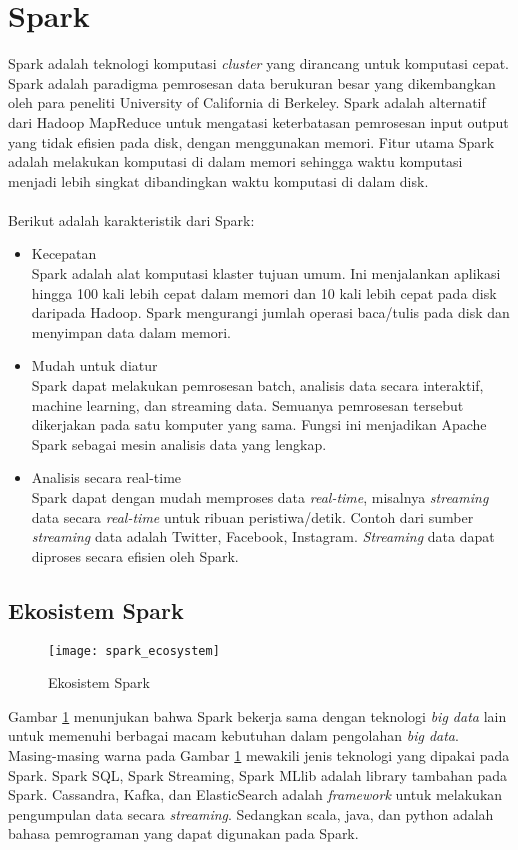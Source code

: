 \section{Spark} 
\label{sec:konsep_spark}
Spark adalah teknologi komputasi \textit{cluster} yang dirancang untuk komputasi cepat. Spark adalah paradigma pemrosesan data berukuran besar yang dikembangkan oleh para peneliti University of California di Berkeley. Spark adalah alternatif dari Hadoop MapReduce untuk mengatasi keterbatasan pemrosesan input output yang tidak efisien pada disk, dengan menggunakan memori. Fitur utama Spark adalah melakukan komputasi di dalam memori sehingga waktu komputasi menjadi lebih singkat dibandingkan waktu komputasi di dalam disk.
\\\\
Berikut adalah karakteristik dari Spark:
\begin{itemize}
\item Kecepatan\\
Spark adalah alat komputasi klaster tujuan umum. Ini menjalankan aplikasi hingga 100 kali lebih cepat dalam memori dan 10 kali lebih cepat pada disk daripada Hadoop. Spark mengurangi jumlah operasi baca/tulis pada disk dan menyimpan data dalam memori.

\item Mudah untuk diatur\\	
Spark dapat melakukan pemrosesan batch, analisis data secara interaktif, machine learning, dan streaming data. Semuanya pemrosesan tersebut dikerjakan pada satu komputer yang sama. Fungsi ini menjadikan Apache Spark sebagai mesin analisis data yang lengkap. 


\item Analisis secara real-time\\
Spark dapat dengan mudah memproses data \textit{real-time}, misalnya \textit{streaming} data secara \textit{real-time} untuk ribuan peristiwa/detik. Contoh dari sumber \textit{streaming} data adalah Twitter, Facebook, Instagram. \textit{Streaming} data dapat diproses secara efisien oleh Spark.
\end{itemize}

\subsection{Ekosistem Spark}
\begin{figure}[H]
	\centering
	\texttt{[image: spark\_ecosystem]}
	\caption{Ekosistem Spark}
	\label{fig:spark_ecosystem}
\end{figure}
Gambar \ref{fig:spark_ecosystem} menunjukan bahwa Spark bekerja sama dengan teknologi \textit{big data} lain untuk memenuhi berbagai macam kebutuhan dalam pengolahan \textit{big data}. Masing-masing warna pada Gambar \ref{fig:spark_ecosystem} mewakili jenis teknologi yang dipakai pada Spark. Spark SQL, Spark Streaming, Spark MLlib adalah library tambahan pada Spark. Cassandra, Kafka, dan ElasticSearch adalah \textit{framework} untuk melakukan pengumpulan data secara \textit{streaming}. Sedangkan scala, java, dan python adalah bahasa pemrograman yang dapat digunakan pada Spark.

